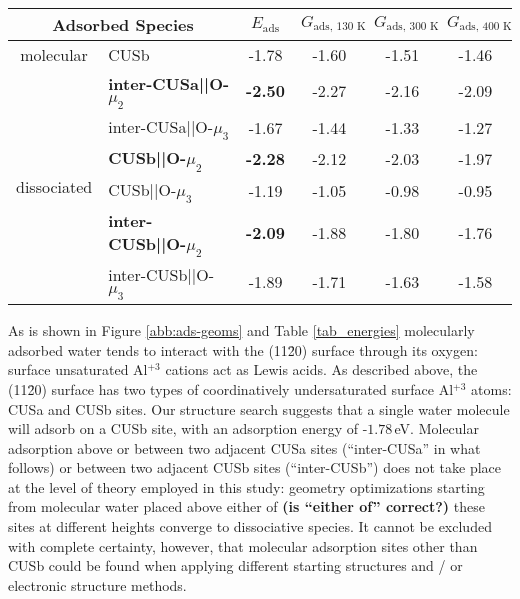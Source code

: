 \documentclass[twoside,twocolumn,9pt]{article}
\begin{document}

\begin{table*}[!h]
  \centering
 \caption{Adsorption energies $E_\textrm{ads}=E_\text{ads. species}-E_\text{free molecule+surface}$ for molecular and (singly) dissociated water on $\alpha$-(11\=20) according to periodic PBE+D2 calculations. The corresponding adsorption free energies $G_\textrm{ads}$ at 130, 300 and 400 K defined analogously are also given. Three most stable configurations are in bold. All energies are in eV. 
\vspace*{.2cm} 
  }
  \begin{tabular}{cl|cccc}
   \multicolumn{2}{c|}{Adsorbed Species}  & $E_\text{ads}$ & $G_\text{ads, 130 K}$  &  $G_\text{ads, 300 K}$  & $G_\text{ads, 400 K}$ \\
\hline
\multirow{1}{*}{molecular} & CUSb          &   -1.78  &-1.60 & -1.51  & -1.46 \\
  \hline
 \multirow{6}{*}{dissociated} & \bf inter-CUSa||O-$\mu_2$ & \bf-2.50 &-2.27 & -2.16 & -2.09 \\
  & inter-CUSa||O-$\mu_3$ & -1.67 &-1.44 &-1.33 & -1.27 \\
  & \bf CUSb||O-$\mu_2$ & \bf -2.28 & -2.12& -2.03 &-1.97  \\
 & CUSb||O-$\mu_3$ & -1.19 &-1.05 &-0.98 & -0.95 \\%
 & \bf inter-CUSb||O-$\mu_2$ & \bf -2.09 &-1.88 &-1.80 & -1.76 \\
 & inter-CUSb||O-$\mu_3$ & -1.89 &-1.71 & -1.63 & -1.58 \\
  \end{tabular}
  \label{tab_energies}
\end{table*}


As is shown in Figure \ref{abb:ads-geoms} and Table \ref{tab_energies} molecularly adsorbed water tends to interact with the (11\={2}0) surface through its oxygen: surface unsaturated Al$^{+3}$ cations act as Lewis acids. As described above, the (11\=20) surface has two types of coordinatively undersaturated surface Al$^{+3}$ atoms: CUSa and CUSb sites. Our structure search suggests that a single water molecule will adsorb on a CUSb site, with an adsorption energy of -$1.78\,$eV. 
 Molecular adsorption above or between two adjacent CUSa sites (``inter-CUSa'' in what follows) 
 or between two adjacent CUSb sites (``inter-CUSb'') does not take place at the 
 level of theory employed in this study:
 geometry optimizations starting from molecular water placed above either of \textbf{(is ``either of'' correct?)} these sites at different heights converge to 
 dissociative species. It cannot be excluded with complete certainty, however, 
 that  molecular adsorption sites other than CUSb could be found when applying different 
 starting structures and / or 
 electronic structure methods.
\end{document}
